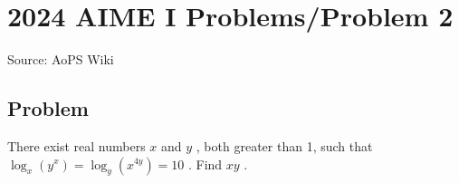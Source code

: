 \documentclass[12pt]{article}
\begin{document}
\section*{{2024 AIME I Problems/Problem 2}}
Source: AoPS Wiki

\subsection*{Problem}
There exist real numbers $x$ and $y$ , both greater than 1, such that $\log_x\left(y^x\right)=\log_y\left(x^{4y}\right)=10$ . Find $xy$ .
\end{document}
